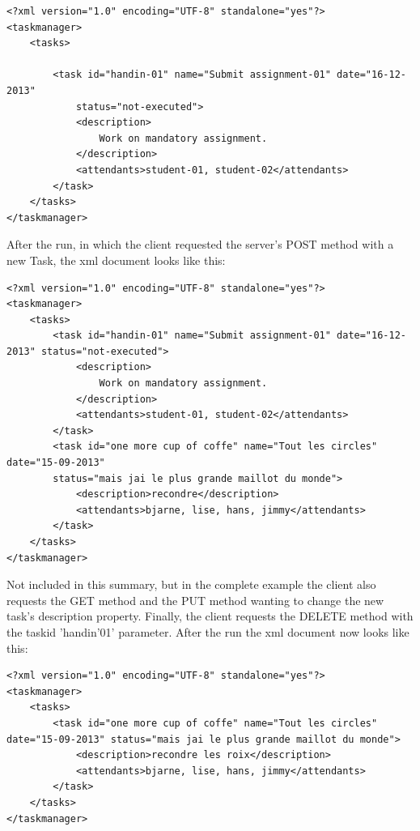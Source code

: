 \begin{lstlisting}[caption=xml before run]
<?xml version="1.0" encoding="UTF-8" standalone="yes"?>
<taskmanager>
	<tasks>
		
		<task id="handin-01" name="Submit assignment-01" date="16-12-2013"
			status="not-executed">
			<description>
				Work on mandatory assignment.
			</description>
			<attendants>student-01, student-02</attendants>
		</task>	
	</tasks>
</taskmanager>

\end{lstlisting}


After the run, in which the client requested the server's POST method with a new Task, the xml document looks like this:

\begin{lstlisting}[caption=xml after POST]
<?xml version="1.0" encoding="UTF-8" standalone="yes"?>
<taskmanager>
	<tasks>
		<task id="handin-01" name="Submit assignment-01" date="16-12-2013" status="not-executed">
			<description>
				Work on mandatory assignment.
			</description>
			<attendants>student-01, student-02</attendants>
		</task>
		<task id="one more cup of coffe" name="Tout les circles" date="15-09-2013" 
		status="mais jai le plus grande maillot du monde">
			<description>recondre</description>
			<attendants>bjarne, lise, hans, jimmy</attendants>
		</task>
	</tasks>
</taskmanager>
\end{lstlisting}

Not included in this summary, but in the complete example the client also requests the GET method and the PUT method wanting to change the new task's description property. Finally, the client requests the DELETE method with the taskid 'handin'01' parameter. After the run the xml document now looks like this:

\begin{lstlisting}[caption=xml after PUT]
<?xml version="1.0" encoding="UTF-8" standalone="yes"?>
<taskmanager>
	<tasks>
		<task id="one more cup of coffe" name="Tout les circles" date="15-09-2013" status="mais jai le plus grande maillot du monde">
			<description>recondre les roix</description>
			<attendants>bjarne, lise, hans, jimmy</attendants>
		</task>
	</tasks>
</taskmanager>
\end{lstlisting}


